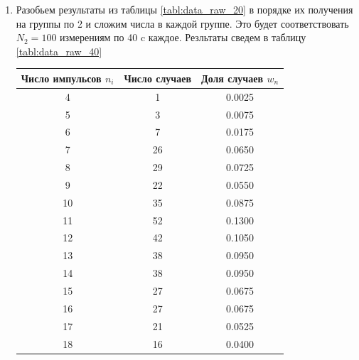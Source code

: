 \documentclass[a4paper, 12pt]{article}
\begin{document}
\begin{enumerate}
    \item Разобьем результаты из таблицы \ref{tabl:data_raw_20} в порядке их получения на группы по 2 и сложим числа в каждой группе. Это будет соответствовать $N_2=100$ измерениям по 40 c каждое. Резльтаты сведем в таблицу \ref{tabl:data_raw_40}

    \begin{table}[h!]
        \centering
        \begin{tabular}{| c | c | c |}
        \hline
        \textbf{Число импульсов $n_i$} & \textbf{Число случаев} & \textbf{Доля случаев $w_n$} \\\hline\hline
        4                        & 1                      & 0.0025                \\\hline
        5                        & 3                      & 0.0075                \\\hline
        6                        & 7                      & 0.0175                \\\hline
        7                        & 26                     & 0.0650                \\\hline
        8                        & 29                     & 0.0725                \\\hline
        9                        & 22                     & 0.0550                \\\hline
        10                       & 35                     & 0.0875                \\\hline
        11                       & 52                     & 0.1300                \\\hline
        12                       & 42                     & 0.1050                \\\hline
        13                       & 38                     & 0.0950                \\\hline
        14                       & 38                     & 0.0950                \\\hline
        15                       & 27                     & 0.0675                \\\hline
        16                       & 27                     & 0.0675                \\\hline
        17                       & 21                     & 0.0525                \\\hline
        18                       & 16                     & 0.0400                \\\hline

\end{tabular}
\end{table}
\end{enumerate}
\end{document}
